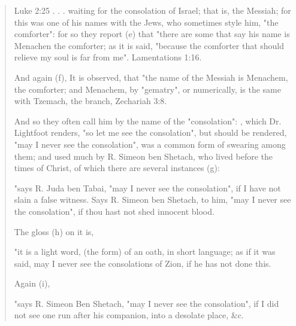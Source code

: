 \documentclass[11pt]{article}
\begin{document}
\begin{quote}
Luke 2:25
. . . 
waiting for the consolation of Israel; that is, the Messiah; for this was one of his names with the Jews, who sometimes style him, "the comforter": for so they report (e) that "there are some that say his name is Menachen the comforter; as it is said, "because the comforter that should relieve my soul is far from me". Lamentations 1:16.

And again (f), It is observed, that "the name of the Messiah is Menachem, the comforter; and Menachem, by "gematry", or numerically, is the same with Tzemach, the branch, Zechariah 3:8.

And so they often call him by the name of the "consolation": , which Dr. Lightfoot renders, "so let me see the consolation", but should be rendered, "may I never see the consolation", was a common form of swearing among them; and used much by R. Simeon ben Shetach, who lived before the times of Christ, of which there are several instances (g):

"says R. Juda ben Tabai, "may I never see the consolation", if I have not slain a false witness. Says R. Simeon ben Shetach, to him, "may I never see the consolation", if thou hast not shed innocent blood.

The gloss (h) on it is,

"it is a light word, (the form) of an oath, in short language; as if it was said, may I never see the consolations of Zion, if he has not done this.

Again (i),

"says R. Simeon Ben Shetach, "may I never see the consolation", if I did not see one run after his companion, into a desolate place, \&c.


\end{quote}
\end{document}

